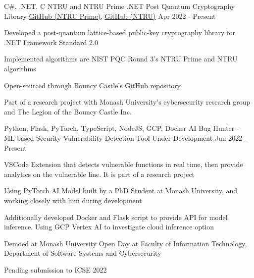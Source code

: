 




\begin{cventries}

  \cventry
  {C\#, .NET, C}
  {NTRU and NTRU Prime .NET Post Quantum Cryptography Library}
  {\href{https://github.com/bcgit/bc-csharp/tree/master/crypto/src/pqc/crypto/ntruprime}{GitHub (NTRU Prime)}, \href{https://github.com/bcgit/bc-csharp/tree/master/crypto/src/pqc/crypto/ntru}{GitHub (NTRU)}} %
  {Apr 2022 - Present}
  {
    \begin{cvitems}
      \item {Developed a post-quantum lattice-based public-key cryptography library for .NET Framework Standard 2.0}
      \item {Implemented algorithms are NIST PQC Round 3's NTRU Prime and NTRU algorithms}
      \item {Open-sourced through Bouncy Castle's GitHub repository}
      \item {Part of a research project with Monash University's cybersecurity research group and The Legion of the Bouncy Castle Inc.}
    \end{cvitems}
  }

  \cventry
  {Python, Flask, PyTorch, TypeScript, NodeJS, GCP, Docker}
  {AI Bug Hunter - ML-based Security Vulnerability Detection Tool}
  {Under Development} %
  {Jun 2022 - Present}
  {
    \begin{cvitems}
      \item {VSCode Extension that detects vulnerable functions in real time, then provide analytics on the vulnerable line. It is part of a research project}
      \item {Using PyTorch AI Model built by a PhD Student at Monash University, and working closely with him during development}
      \item {Additionally developed Docker and Flask script to provide API for model inference. Using GCP Vertex AI to investigate cloud inference option}
      \item {Demoed at Monash University Open Day at Faculty of Information Technology, Department of Software Systems and Cybersecurity}
      \item {Pending submission to ICSE 2022}
    \end{cvitems}
  }


\end{cventries}
